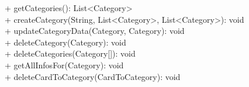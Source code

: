 {
    + getCategories(): List<Category> \\
    + createCategory(String, List<Category>, List<Category>): void \\
    + updateCategoryData(Category, Category): void \\
    + deleteCategory(Category): void \\
    + deleteCategories(Category[]): void \\
    + getAllInfosFor(Category): void \\ %
    + deleteCardToCategory(CardToCategory): void
}{}